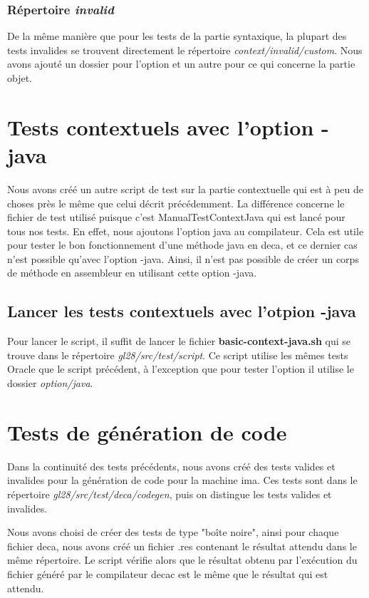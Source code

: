 \documentclass[12pt, a4paper, one side]{article}
\begin{document}
\subsubsection{Répertoire \textit{invalid}}
De la même manière que pour les tests de la partie syntaxique, la plupart des tests invalides se trouvent directement le répertoire \textit{context/invalid/custom}. Nous avons ajouté un dossier pour l'option et un autre pour ce qui concerne la partie objet.

\section{Tests contextuels avec l'option -java}
Nous avons créé un autre script de test sur la partie contextuelle qui est à peu de choses près le même que celui décrit précédemment. La différence concerne le fichier de test utilisé puisque c'est ManualTestContextJava qui est lancé pour tous nos tests. En effet, nous ajoutons l'option java au compilateur. Cela est utile pour tester le bon fonctionnement d'une méthode java en deca, et ce dernier cas n'est possible qu'avec l'option -java. Ainsi, il n'est pas possible de créer un corps de méthode en assembleur en utilisant cette option -java.

\subsection{Lancer les tests contextuels avec l'otpion -java}
Pour lancer le script, il suffit de lancer le fichier \textbf{basic-context-java.sh} qui se trouve dans le répertoire \textit{gl28/src/test/script}. Ce script utilise les mêmes tests Oracle que le script précédent, à l'exception que pour tester l'option il utilise le dossier \textit{option/java}.

\section{Tests de génération de code}
Dans la continuité des tests précédents, nous avons créé des tests valides et invalides pour la génération de code pour la machine ima. Ces tests sont dans le répertoire \textit{gl28/src/test/deca/codegen}, puis on distingue les tests valides et invalides.

\begin{flushleft}
Nous avons choisi de créer des tests de type "boîte noire", ainsi pour chaque fichier deca, nous avons créé un fichier .res contenant le résultat attendu dans le même répertoire. Le script vérifie alors que le résultat obtenu par l'exécution du fichier généré par le compilateur decac est le même que le résultat qui est attendu. 
\end{flushleft}
\end{document}
